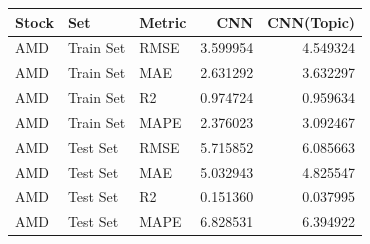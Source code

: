 \begin{tabular}{lllrr}
\toprule
Stock & Set & Metric & CNN & CNN(Topic) \\
\midrule
AMD & Train Set & RMSE & 3.599954 & 4.549324 \\
AMD & Train Set & MAE & 2.631292 & 3.632297 \\
AMD & Train Set & R2 & 0.974724 & 0.959634 \\
AMD & Train Set & MAPE & 2.376023 & 3.092467 \\
AMD & Test Set & RMSE & 5.715852 & 6.085663 \\
AMD & Test Set & MAE & 5.032943 & 4.825547 \\
AMD & Test Set & R2 & 0.151360 & 0.037995 \\
AMD & Test Set & MAPE & 6.828531 & 6.394922 \\
\bottomrule
\end{tabular}
